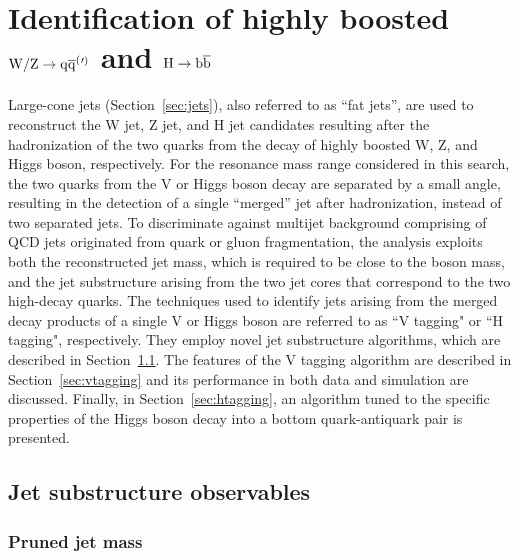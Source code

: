 \chapter{Identification of highly boosted $\mathrm{W}/\mathrm{Z}\to\mathrm{q}\overline{\mathrm{q}}^({}'^){}$ and $\mathrm{H}\to{\mathrm{b}\overline{\mathrm{b}}}$}
\label{ch:vtagging}

Large-cone jets (Section~\ref{sec:jets}), also referred to as ``fat jets'', are used to reconstruct the W jet, Z jet, and H jet candidates resulting after the hadronization of the two quarks from the decay of highly boosted W, Z, and Higgs boson, respectively. For the resonance mass range considered in this search, the two quarks from the V or Higgs boson decay are separated by a small angle, resulting in the detection of a single ``merged'' jet after hadronization, instead of two separated jets.
To discriminate against multijet background comprising of QCD jets originated from quark or gluon fragmentation, the analysis exploits both the reconstructed jet mass, which is required to be close to the boson mass, and the jet substructure arising from the two jet cores that correspond to the two high-\pt decay quarks. The techniques used to identify jets arising from the merged decay products of a single V or Higgs boson are referred to as ``V tagging" or ``H tagging", respectively. They employ novel jet substructure algorithms, which are described in Section~\ref{sec:jetsubalgo}. The features of the V tagging algorithm are described in Section~\ref{sec:vtagging} and its performance in both data and simulation are discussed. 
Finally, in Section~\ref{sec:htagging}, an algorithm tuned to the specific properties of the Higgs boson decay into a bottom quark-antiquark pair is presented.

\section{Jet substructure observables}
\label{sec:jetsubalgo}

\subsection{Pruned jet mass}
\label{subsec:pruning}

